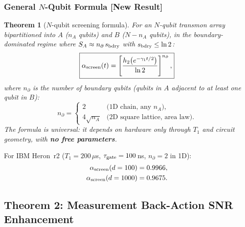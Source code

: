 \documentclass[12pt]{article}
\newtheorem{theorem}{Theorem}
\newcommand{\newresult}{\textbf{[New Result]}}
\begin{document}
\subsubsection{General $N$-Qubit Formula \newresult}

\begin{theorem}[$N$-qubit screening formula]
\label{thm:Nqubit}
For an $N$-qubit transmon array bipartitioned into $A$ ($n_A$ qubits) and $B$
($N-n_A$ qubits), in the boundary-dominated regime where $S_A \approx n_\partial\,s_{\rm bdry}$
with $s_{\rm bdry} \le \ln 2$:
\begin{equation}
\boxed{
\alpha_{\rm screen}(t) =
\left[\frac{h_2\!\left(e^{-\gamma_1 t/2}\right)}{\ln 2}\right]^{n_\partial},}
\label{eq:screen_Nqubit}
\end{equation}
where $n_\partial$ is the number of boundary qubits (qubits in $A$ adjacent to at
least one qubit in $B$):
\begin{equation}
n_\partial = \begin{cases}
2 & \text{(1D chain, any } n_A\text{)},\\[4pt]
4\sqrt{n_A} & \text{(2D square lattice, area law)}.
\end{cases}
\label{eq:n_partial}
\end{equation}
The formula is universal: it depends on hardware only through $T_1$ and circuit geometry,
with \textbf{no free parameters}.
\end{theorem}

For IBM Heron~r2 ($T_1 = 200\,\mu$s, $\tau_{\rm gate} = 100\,$ns, $n_\partial = 2$ in 1D):
\begin{align}
\alpha_{\rm screen}(d=100) &= 0.9966, \label{eq:screen_d100}\\
\alpha_{\rm screen}(d=1000) &= 0.9675. \label{eq:screen_d1000}
\end{align}

\subsection{Theorem 2: Measurement Back-Action SNR Enhancement}
\end{document}
